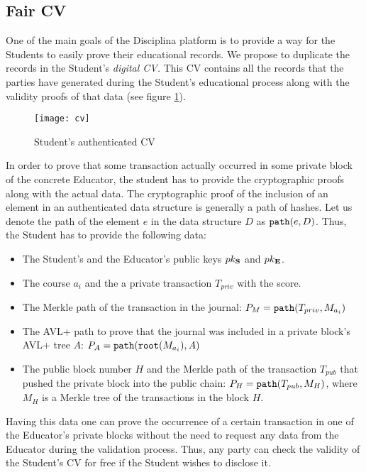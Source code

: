 \subsection{Fair CV}
One of the main goals of the Disciplina platform is to provide a way for the Students to easily prove their educational records. We propose to duplicate the records in the Student's \textit{digital CV.} This CV contains all the records that the parties have generated during the Student's educational process along with the validity proofs of that data (see figure \ref{fig:cv}).

\begin{figure}[ht]
\centering
\texttt{[image: cv]}
\caption{Student's authenticated CV}
\label{fig:cv}
\end{figure}

In order to prove that some transaction actually occurred in some private block of the concrete Educator, the student has to provide the cryptographic proofs along with the actual data. The cryptographic proof of the inclusion of an element in an authenticated data structure is generally a path of hashes. Let us denote the path of the element $e$ in the data structure $D$ as $\mathtt{path}(e, D)$. Thus, the Student has to  provide the following data:
\begin{itemize}
  \item The Student's and the Educator's public keys $pk_{\mathbf{S}}$ and $pk_{\mathbf{E}}$.
  \item The course $a_i$ and the a private transaction $T_{priv}$ with the score.
  \item The Merkle path of the transaction in the journal: $P_{M} = \mathtt{path}(T_{priv}, M_{a_i})$
  \item The AVL+ path to prove that the journal was included in a private block's AVL+ tree $A$: $P_{A} = \mathtt{path}(\mathtt{root}(M_{a_i}), A)$
  \item The public block number $H$ and the Merkle path of the transaction $T_{pub}$ that pushed the private block into the public chain: $P_{H} = \mathtt{path}(T_{pub}, M_H)$, where $M_H$ is a Merkle tree of the transactions in the block $H$.
\end{itemize}

Having this data one can prove the occurrence of a certain transaction in one of the Educator's private blocks without the need to request any data from the Educator during the validation process. Thus, any party can check the validity of the Student's CV for free if the Student wishes to disclose it.

